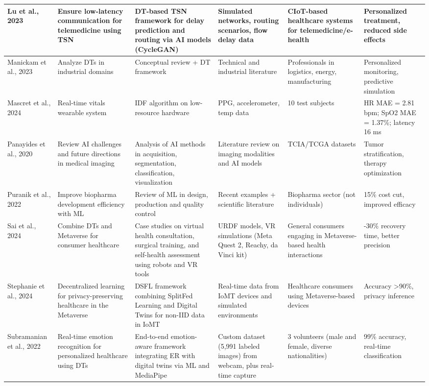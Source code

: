 \documentclass[10pt,a4paper]{article}
\begin{document}
\begin{small}
\begin{longtable}{|p{2cm}|p{2.8cm}|p{2.8cm}|p{2cm}|p{2cm}|p{3.2cm}|}
Lu et al., 2023 & Ensure low-latency communication for telemedicine using TSN & DT-based TSN framework for delay prediction and routing via AI models (CycleGAN) & Simulated networks, routing scenarios, flow delay data & CIoT-based healthcare systems for telemedicine/e-health & Personalized treatment, reduced side effects \\
\hline
Manickam et al., 2023 & Analyze DTs in industrial domains & Conceptual review + DT framework & Technical and industrial literature & Professionals in logistics, energy, manufacturing & Personalized monitoring, predictive simulation \\
\hline
Mascret et al., 2024 & Real-time vitals wearable system & IDF algorithm on low-resource hardware & PPG, accelerometer, temp data & 10 test subjects & HR MAE = 2.81 bpm; SpO2 MAE = 1.37\%; latency 16 ms \\
\hline
Panayides et al., 2020 & Review AI challenges and future directions in medical imaging & Analysis of AI methods in acquisition, segmentation, classification, visualization & Literature review on imaging modalities and AI models & TCIA/TCGA datasets & Tumor stratification, therapy optimization \\
\hline
Puranik et al., 2022 & Improve biopharma development efficiency with ML & Review of ML in design, production and quality control & Recent examples + scientific literature & Biopharma sector (not individuals) & 15\% cost cut, improved efficacy \\
\hline

Sai et al., 2024 & Combine DTs and Metaverse for consumer healthcare & Case studies on virtual health consultation, surgical training, and self-health assessment using robots and VR tools & URDF models, VR simulations (Meta Quest 2, Reachy, da Vinci kit) & General consumers engaging in Metaverse-based health interactions & -30\% recovery time, better precision \\
\hline

Stephanie et al., 2024 & Decentralized learning for privacy-preserving healthcare in the Metaverse & DSFL framework combining SplitFed Learning and Digital Twins for non-IID data in IoMT & Real-time data from IoMT devices and simulated environments & Healthcare consumers using Metaverse-based devices & Accuracy >90\%, privacy inference \\
\hline
Subramanian et al., 2022 & Real-time emotion recognition for personalized healthcare using DTs & End-to-end emotion-aware framework integrating ER with digital twins via ML and MediaPipe & Custom dataset (5,991 labeled images) from webcam, plus real-time capture & 3 volunteers (male and female, diverse nationalities) & 99\% accuracy, real-time classification \\
\hline


\end{longtable}
\end{small}
\end{document}
